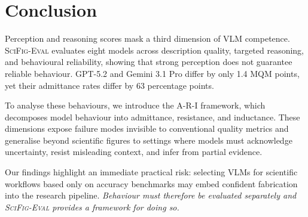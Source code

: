 \section{Conclusion}
\label{sec:conclusion}
Perception and reasoning scores mask a third dimension of VLM competence. \textsc{SciFig-Eval} evaluates eight models across description quality, targeted reasoning, and behavioural reliability, showing that strong perception does not guarantee reliable behaviour. GPT-5.2 and Gemini 3.1 Pro differ by only 1.4 MQM points, yet their admittance rates differ by 63 percentage points.

To analyse these behaviours, we introduce the A-R-I framework, which decomposes model behaviour into admittance, resistance, and inductance. These dimensions expose failure modes invisible to conventional quality metrics and generalise beyond scientific figures to settings where models must acknowledge uncertainty, resist misleading context, and infer from partial evidence.

Our findings highlight an immediate practical risk: selecting VLMs for scientific workflows based only on accuracy benchmarks may embed confident fabrication into the research pipeline. \textit{Behaviour must therefore be evaluated separately and \textsc{SciFig-Eval} provides a framework for doing so.}




